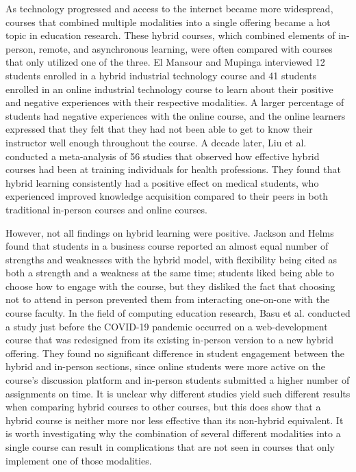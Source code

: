 As technology progressed and access to the internet became more widespread, courses that combined multiple modalities into a single offering became a hot topic in education research. These hybrid courses, which combined elements of in-person, remote, and asynchronous learning, were often compared with courses that only utilized one of the three. El Mansour and Mupinga \cite{el2007students} interviewed 12 students enrolled in a hybrid industrial technology course and 41 students enrolled in an online industrial technology course to learn about their positive and negative experiences with their respective modalities. A larger percentage of students had negative experiences with the online course, and the online learners expressed that they felt that they had not been able to get to know their instructor well enough throughout the course. A decade later, Liu et al. \cite{liu2016effectiveness} conducted a meta-analysis of 56 studies that observed how effective hybrid courses had been at training individuals for health professions. They found that hybrid learning consistently had a positive effect on medical students, who experienced improved knowledge acquisition compared to their peers in both traditional in-person courses and online courses.

However, not all findings on hybrid learning were positive. Jackson and Helms \cite{jackson2008student} found that students in a business course reported an almost equal number of strengths and weaknesses with the hybrid model, with flexibility being cited as both a strength and a weakness at the same time; students liked being able to choose how to engage with the course, but they disliked the fact that choosing not to attend in person prevented them from interacting one-on-one with the course faculty. In the field of computing education research, Basu et al. \cite{basu2021online} conducted a study just before the COVID-19 pandemic occurred on a web-development course that was redesigned from its existing in-person version to a new hybrid offering. They found no significant difference in student engagement between the hybrid and in-person sections, since online students were more active on the course's discussion platform and in-person students submitted a higher number of assignments on time. It is unclear why different studies yield such different results when comparing hybrid courses to other courses, but this does show that a hybrid course is neither more nor less effective than its non-hybrid equivalent. It is worth investigating why the combination of several different modalities into a single course can result in complications that are not seen in courses that only implement one of those modalities.

